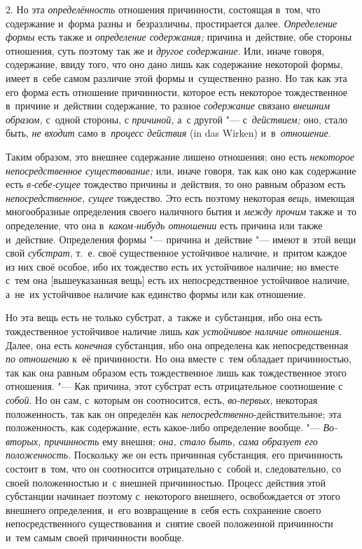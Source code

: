 2. Но эта {\em определённость} отношения причинности, состоящая в~том, что
содержание и~форма разны и~безразличны, простирается далее. {\em Определение
формы} есть также и {\em определение содержания;} причина и~действие, обе
стороны отношения, суть поэтому так же и {\em другое содержание}. Или, иначе
говоря, содержание, ввиду того, что оно дано лишь как содержание некоторой
формы, имеет в~себе самом различие этой формы и~существенно разно. Но так как
эта его форма есть отношение причинности, которое есть некоторое тождественное
в~причине и~действии содержание, то разное {\em содержание} связано
{\em внешним образом,} с~одной стороны, с {\em причиной,} а~с другой "---
с~{\em действием;} оно, стало быть, {\em не входит} само
в~{\em процесс действия} (in das Wir\-ken) и~в~{\em отношение}.

Таким образом, это внешнее содержание лишено отношения; оно есть
{\em некоторое непосредственное существование;} или, иначе говоря, так как оно
как содержание есть {\em в-себе-сущее} тождество причины и~действия, то оно
равным образом есть {\em непосредственное, сущее} тождество. Это есть поэтому
некоторая {\em вещь,} имеющая многообразные определения своего наличного бытия
и {\em между прочим} также и~то определение, что она
в~{\em каком-нибудь отношении} есть причина или также и~действие. Определения
формы "--- причина и~действие "--- имеют в~этой вещи свой {\em субстрат,} т.~е.
своё существенное устойчивое наличие, и~притом каждое из них своё особое, ибо
их тождество есть их устойчивое наличие; но вместе с~тем она
[вышеуказанная вещь] есть их непосредственное устойчивое наличие,
а~не~их устойчивое наличие как единство формы или как отношение.

Но эта вещь есть не только субстрат, а~также и~субстанция, ибо она есть
тождественное устойчивое наличие лишь {\em как устойчивое наличие отношения}.
Далее, она есть {\em конечная} субстанция, ибо она определена как
непосредственная {\em по отношению} к~её причинности. Но она вместе с~тем
обладает причинностью, так как она равным образом есть тождественное лишь как
тождественное этого отношения. "--- Как причина, этот субстрат есть
отрицательное соотношение с {\em собой}. Но он сам, с~которым он соотносится,
есть, {\em во-первых,} некоторая положенность, так как он определён как
{\em непосредственно}-действительное; эта положенность, как содержание, есть
какое-либо определение вообще. "--- {\em Во-вторых, причинность} ему
внешня; {\em она, стало быть, сама образует его положенность}. Поскольку же он
есть причинная субстанция, его причинность состоит в~том, что он соотносится
отрицательно с~собой и, следовательно, со своей положенностью и~с внешней
причинностью. Процесс действия этой субстанции начинает поэтому с~некоторого
внешнего, освобождается от этого внешнего определения, и~его возвращение в~себя
есть сохранение своего непосредственного существования и~снятие своей
положенной причинности и~тем самым своей причинности вообще.

